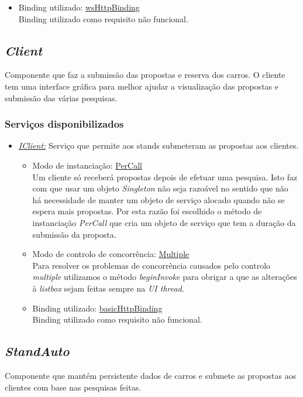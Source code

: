 \documentclass[a4paper]{article}
\begin{document}
\begin{itemize}
\begin{itemize}
		\item
		Binding utilizado: \underline{wsHttpBinding}\\
		Binding utilizado como requisito não funcional.
	\end{itemize}
\end{itemize}

\newpage


\subsection{\emph{Client}}
Componente que faz a submissão das propostas e reserva dos carros. O cliente tem uma interface gráfica para melhor ajudar a visualização das propostas e submissão das várias pesquisas.
\subsubsection{Serviços disponibilizados}
\begin{itemize} 

\item
\emph{\underline{IClient:}}
Serviço que permite aos stands submeteram as propostas aos clientes.
	\begin{itemize}
		\item
		Modo de instanciação: \underline{PerCall}\\
		Um cliente só receberá propostas depois de efetuar uma pesquisa. Isto faz com que usar um objeto \emph{Singleton} não seja razoável no sentido que não há necessidade de manter um objeto de serviço alocado quando não se espera mais propostas. Por esta razão foi escolhido o método de instanciação \emph{PerCall} que cria um objeto de serviço que tem a duração da submissão da proposta.
		\item
		Modo de controlo de concorrência: \underline{Multiple}\\
		Para resolver os problemas de concorrência causados pelo controlo \emph{multiple} utilizamos o método \emph{beginInvoke} para obrigar a que as alterações à \emph{listbox} sejam feitas sempre na \emph{UI thread}.
		
		\item
		Binding utilizado: \underline{basicHttpBinding}\\
		Binding utilizado como requisito não funcional.
	\end{itemize}
\end{itemize}


\subsection{\emph{StandAuto}}
Componente que mantém persistente dados de carros e submete as propostas aos clientes com base nas pesquisas feitas.
\end{document}
